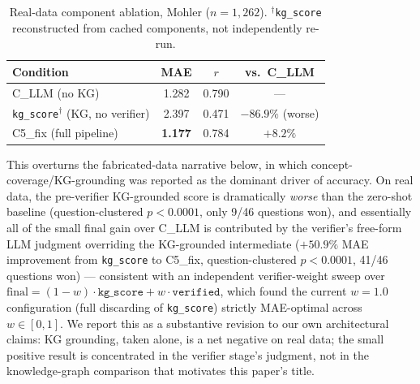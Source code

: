 \documentclass[conference]{IEEEtran}
\begin{document}
\begin{table}[t]
\caption{Real-data component ablation, Mohler ($n=1{,}262$). $^{\dagger}$\texttt{kg\_score}
reconstructed from cached components, not independently re-run.}
\label{tab:ablation_real}
\centering
\footnotesize
\begin{tabular}{lccc}
\toprule
\textbf{Condition} & \textbf{MAE} & \textbf{$r$} & \textbf{vs.\ C\_LLM} \\
\midrule
C\_LLM (no KG) & 1.282 & 0.790 & --- \\
\texttt{kg\_score}$^{\dagger}$ (KG, no verifier) & 2.397 & 0.471 & $-86.9\%$ (worse) \\
C5\_fix (full pipeline) & \textbf{1.177} & 0.784 & $+8.2\%$ \\
\bottomrule
\end{tabular}
\end{table}

This overturns the fabricated-data narrative below, in which
concept-coverage/KG-grounding was reported as the dominant driver of
accuracy. On real data, the pre-verifier KG-grounded score is
dramatically \emph{worse} than the zero-shot baseline (question-clustered
$p<0.0001$, only 9/46 questions won), and essentially all of the small
final gain over C\_LLM is contributed by the verifier's free-form LLM
judgment overriding the KG-grounded intermediate ($+50.9\%$ MAE
improvement from \texttt{kg\_score} to C5\_fix, question-clustered
$p<0.0001$, 41/46 questions won) --- consistent with an independent
verifier-weight sweep over $\mathrm{final}=(1-w)\cdot\texttt{kg\_score}+w\cdot\texttt{verified}$,
which found the current $w=1.0$ configuration (full discarding of
\texttt{kg\_score}) strictly MAE-optimal across $w\in[0,1]$. We report
this as a substantive revision to our own architectural claims: KG
grounding, taken alone, is a net negative on real data; the small
positive result is concentrated in the verifier stage's judgment, not
in the knowledge-graph comparison that motivates this paper's title.
\end{document}
